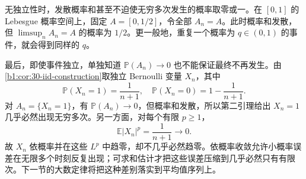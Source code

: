 无独立性时，发散概率和甚至不迫使无穷多次发生的概率取零或一。在 \([0,1]\) 的 Lebesgue 概率空间上，固定 \(A=[0,1/2]\)，令全部 \(A_n=A\)。此时概率和发散，但 \(\limsup_nA_n=A\) 的概率为 \(1/2\)。更一般地，重复一个概率为 \(q\in(0,1)\) 的事件，就会得到同样的 \(q\)。

\ProseParagraphBreak

最后，即使事件独立，单独知道 \(\mathbb P(A_n)\to0\) 也不能保证最终不再发生。由\cref{b1:cor:30-iid-construction}取独立 Bernoulli 变量 \(X_n\)，其中
\[
 \mathbb P(X_n=1)=\frac1{n+1},
 \quad \mathbb P(X_n=0)=1-\frac1{n+1}.
\]
对 \(A_n=\{X_n=1\}\)，有 \(\mathbb P(A_n)\to0\)，但概率和发散，所以第二引理给出 \(X_n=1\) 几乎必然出现无穷多次。另一方面，对每个有限 \(p\geq1\)，
\[
 \mathbb E|X_n|^p=\frac1{n+1}\longrightarrow0.
\]
故 \(X_n\) 依概率并在这些 \(L^p\) 中趋零，却不几乎必然趋零。依概率收敛允许小概率误差在无限多个时刻反复出现；可求和估计才把这些误差压缩到几乎必然只有有限次。下一节的大数定律将把这种差别落实到平均值序列上。
